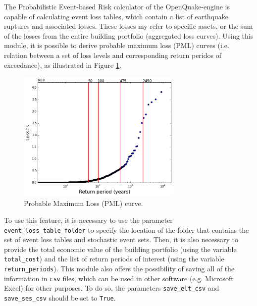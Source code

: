 The Probabilistic Event-based Risk calculator \citep{SilvaEtAl2014a} of the OpenQuake-engine is capable of calculating event loss tables, which contain a list of earthquake ruptures and associated losses. These losses my refer to specific assets, or the sum of the losses from the entire building portfolio (aggregated loss curves).
Using this module, it is possible to derive probable maximum loss (PML) curves (i.e. relation between a set of loss levels and corresponding return peridos of exceedance), as illustrated in Figure \ref{fig:pml}.

\begin{figure}[htb]
  \centering
      \includegraphics[width=8cm]{figures/pml_example.png}
  \caption{Probable Maximum Loss (PML) curve.}
  \label{fig:pml}
\end{figure}

To use this feature, it is necessary to use the parameter \verb=event_loss_table_folder= to specify the location of the folder that contains the set of event loss tables and stochastic event sets. Then, it is also necessary to provide the total economic value of the building portfolio (using the variable \verb=total_cost=) and the list of return periods of interest (using the variable \verb=return_periods=). This module also offers the possibility of saving all of the information in \verb=csv= files, which can be used in other software (e.g. Microsoft Excel) for other purposes. To do so, the parameters \verb=save_elt_csv= and \verb=save_ses_csv= should be set to \verb=True=.